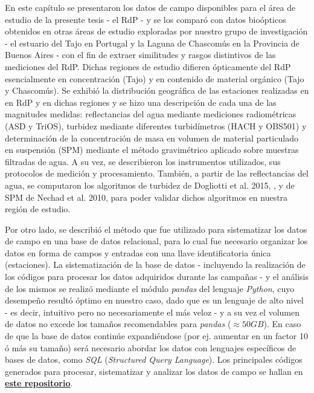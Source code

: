     En este capítulo se presentaron los datos de campo disponibles para el área de estudio de la presente tesis - el RdP - y se los comparó con datos bioópticos obtenidos en otras áreas de estudio exploradas por nuestro grupo de investigación - el estuario del Tajo en Portugal y la Laguna de Chascomús en la Provincia de Buenos Aires - con el fin de extraer similitudes y rasgos distintivos de las mediciones del RdP. Dichas regiones de estudio difieren ópticamente del RdP esencialmente en concentración (Tajo) y en contenido de material orgánico (Tajo y Chascomús). Se exhibió la distribución geográfica de las estaciones realizadas en en RdP y en dichas regiones y se hizo una descripción de cada una de las magnitudes medidas: reflectancias del agua mediante mediciones radiométricas (ASD y TriOS), turbidez mediante diferentes turbidímetros (HACH y OBS501) y determinación de la concentración de masa en volumen de material particulado en suspensión (SPM) mediante el método gravimétrico aplicado sobre muestras filtradas de agua. A su vez, se describieron los instrumentos utilizados, sus protocolos de medición y procesamiento. También, a partir de las reflectancias del agua, se computaron los algoritmos de turbidez de Dogliotti et al. 2015, \cite{dogliotti2015}, y de SPM de Nechad et al. 2010, \cite{nechad2010} para poder validar dichos algoritmos en nuestra región de estudio.
    
    Por otro lado, se describió el método que fue utilizado para sistematizar los datos de campo en una base de datos relacional, para lo cual fue necesario organizar los datos en forma de campos y entradas con una llave identificatoria única (estaciones). La sistematización de la base de datos - incluyendo la realización de los códigos para procesar los datos adquiridos durante las campañas - y el análisis de los mismos se realizó mediante el módulo \textit{pandas} del lenguaje \textit{Python}, cuyo desempeño resultó óptimo en nuestro caso, dado que es un lenguaje de alto nivel - es decir, intuitivo pero no necesariamente el más veloz - y a su vez el volumen de datos no excede los tamaños recomendables para \textit{pandas} ($\approx 50 GB$). En caso de que la base de datos continúe expandiéndose (por ej. aumentar en un factor 10 ó más su tamaño) será necesario abordar los datos con lenguajes específicos de bases de datos, como \textit{SQL} (\textit{Structured Query Language}). Los principales códigos generados para procesar, sistematizar y analizar los datos de campo se hallan en \href{https://github.com/juanchossn/scripts_tesis_doctoral}{\textbf{\underline{este repositorio}}}\cite{repo}.
    
